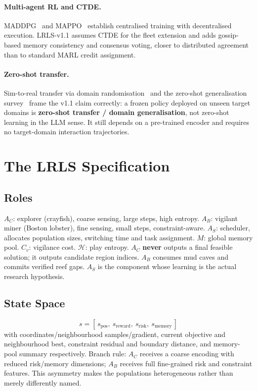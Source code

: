 \documentclass[11pt,a4paper]{article}
\begin{document}
\paragraph{Multi-agent RL and CTDE.} MADDPG~\cite{maddpg} and MAPPO~\cite{mappo} establish centralised training with decentralised execution. LRLS-v1.1 assumes CTDE for the fleet extension and adds gossip-based memory consistency and consensus voting, closer to distributed agreement than to standard MARL credit assignment.

\paragraph{Zero-shot transfer.} Sim-to-real transfer via domain randomisation~\cite{tobin} and the zero-shot generalisation survey~\cite{kirk} frame the v1.1 claim correctly: a frozen policy deployed on unseen target domains is \textbf{zero-shot transfer / domain generalisation}, not zero-shot learning in the LLM sense. It still depends on a pre-trained encoder and requires no target-domain interaction trajectories.

\section{The LRLS Specification}

\subsection{Roles}
$A_C$: explorer (crayfish), coarse sensing, large steps, high entropy. $A_B$: vigilant miner (Boston lobster), fine sensing, small steps, constraint-aware. $A_S$: scheduler, allocates population sizes, switching time and task assignment. $M$: global memory pool. $C_v$: vigilance cost. $\mathcal{H}$: play entropy. $A_C$ \textbf{never} outputs a final feasible solution; it outputs candidate region indices. $A_B$ consumes mud caves and commits verified reef gaps. $A_S$ is the component whose learning is the actual research hypothesis.

\subsection{State Space}
\begin{equation}
s = [\,s_{\mathrm{pos}},\ s_{\mathrm{reward}},\ s_{\mathrm{risk}},\ s_{\mathrm{memory}}\,]
\end{equation}
with coordinates/neighbourhood samples/gradient, current objective and neighbourhood best, constraint residual and boundary distance, and memory-pool summary respectively. Branch rule: $A_C$ receives a coarse encoding with reduced risk/memory dimensions; $A_B$ receives full fine-grained risk and constraint features. This asymmetry makes the populations heterogeneous rather than merely differently named.
\end{document}
